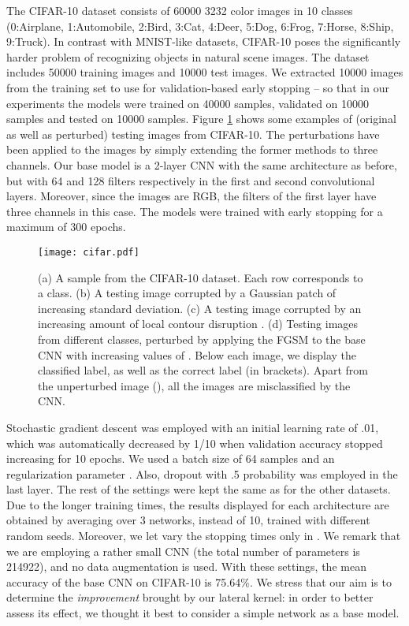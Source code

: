 \documentclass[11pt,oneside,reqno]{amsart}
\begin{document}
 The CIFAR-10 dataset consists of 60000 3232 color images in 10 classes (0:Airplane, 1:Automobile, 2:Bird, 3:Cat, 4:Deer, 5:Dog, 6:Frog, 7:Horse, 8:Ship, 9:Truck). In contrast with MNIST-like datasets, CIFAR-10 poses the significantly harder problem of recognizing objects in natural scene images. The dataset includes 50000 training images and 10000 test images. We extracted 10000 images from the training set to use for validation-based early stopping -- so that in our experiments the models were trained on 40000 samples, validated on 10000 samples and tested on 10000 samples. Figure \ref{cifar} shows some examples of (original as well as perturbed) testing images from CIFAR-10. The perturbations have been applied to the images by simply extending the former methods to three channels. Our base model is a 2-layer CNN with the same architecture as before, but with 64 and 128 filters respectively in the first and second convolutional layers. Moreover, since the images are RGB, the filters of the first layer have three channels in this case. The models were trained with early stopping for a maximum of 300 epochs.
 \begin{figure}[ht!]
 \centering
 \texttt{[image: cifar.pdf]}
 \caption{(a) A sample from the CIFAR-10 dataset. Each row corresponds to a class. (b) A testing image corrupted by a Gaussian patch of increasing standard deviation. (c) A testing image corrupted by an increasing amount of local contour disruption . (d) Testing images from different classes, perturbed by applying the FGSM to the base CNN with increasing values of . Below each image, we display the classified label, as well as the correct label (in brackets). Apart from the unperturbed image (), all the images are misclassified by the CNN.}\label{cifar}
 \end{figure}
 Stochastic gradient descent was employed with an initial learning rate of .01, which was automatically decreased by 1/10 when validation accuracy stopped increasing for 10 epochs. We used a batch size of 64 samples and an  regularization parameter . Also, dropout with .5 probability was employed in the last layer. The rest of the settings were kept the same as for the other datasets. Due to the longer training times, the results displayed for each architecture are obtained by averaging over 3 networks, instead of 10, trained with different random seeds. Moreover, we let vary the stopping times  only in . We remark that we are employing a rather small CNN (the total number of parameters is 214922), and no data augmentation is used. With these settings, the mean accuracy of the base CNN on CIFAR-10 is 75.64\%. We stress that our aim is to determine the \emph{improvement} brought by our lateral kernel: in order to better assess its effect, we thought it best to consider a simple network as a base model.
 
\end{document}
